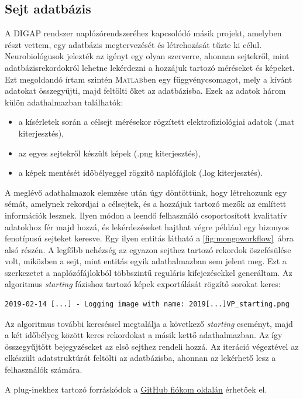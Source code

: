 \documentclass[12pt,a4paper]{report}
\begin{document}
\subsection*{Sejt adatbázis}
A DIGAP rendszer naplózórendszeréhez kapcsolódó másik projekt, amelyben részt vettem, egy adatbázis megtervezését és létrehozását tűzte ki célul. Neurobiológusok jelezték az igényt egy olyan szerverre, ahonnan sejtekről, mint adatbázisrekordokról lehetne lekérdezni a hozzájuk tartozó méréseket és képeket. Ezt megoldandó írtam szintén \textsc{Matlab}ben egy függvénycsomagot, mely a kívánt adatokat összegyűjti, majd feltölti őket az adatbázisba. Ezek az adatok három külön adathalmazban találhatók:
\begin{itemize}
    \item a kísérletek során a célsejt mérésekor rögzített elektrofiziológiai adatok (.mat kiterjesztés),
    \item az egyes sejtekről készült képek (.png kiterjesztés),
    \item a képek mentését időbélyeggel rögzítő naplófájlok (.log kiterjesztés).
\end{itemize}
A meglévő adathalmazok elemzése után úgy döntöttünk, hogy létrehozunk egy sémát, amelynek rekordjai a célsejtek, és a hozzájuk tartozó mezők az említett információk lesznek. Ilyen módon a leendő felhasználó csoportosított kvalitatív adatokhoz fér majd hozzá, és lekérdezéseket hajthat végre például egy bizonyos fenotípusú sejteket keresve. Egy ilyen entitás látható a \ref{fig:mongoworkflow}~ábra alsó részén. A legfőbb nehézség az egyazon sejthez tartozó rekordok öszefésülése volt, miközben a sejt, mint entitás egyik adathalmazban sem jelent meg. Ezt a szerkezetet a naplózófájlokból többszintű reguláris kifejezésekkel generáltam. Az algoritmus \textit{starting} fázishoz tartozó képek exportálását rögzítő sorokat keres:
\begin{verbatim}
2019-02-14 [...] - Logging image with name: 2019[...]VP_starting.png
\end{verbatim}
Az algoritmus további kereséssel megtalálja a következő \textit{starting} eseményt, majd a két időbélyeg között keres rekordokat a másik kettő adathalmazban. Az így összegyűjtött bejegyzéseket az első sejthez rendeli hozzá. Az iteráció végeztével az elkészült adatstruktúrát feltölti az adatbázisba, ahonnan az lekérhető lesz a felhasználók számára.\par
A plug-inekhez tartozó forráskódok a \href{https://github.com/balintdecsi/THESIS.git}{\textsf{GitHub} fiókom oldalán} érhetőek el.
\end{document}
